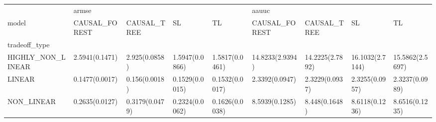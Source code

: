 \begin{tabular}{lllllllll}
\toprule
{} & \multicolumn{4}{l}{armse} & \multicolumn{4}{l}{aauuc} \\
model &   CAUSAL\_FOREST &     CAUSAL\_TREE &              SL &              TL &    CAUSAL\_FOREST &      CAUSAL\_TREE &               SL &               TL \\
tradeoff\_type     &                 &                 &                 &                 &                  &                  &                  &                  \\
\midrule
HIGHLY\_NON\_LINEAR &  2.5941(0.1471) &   2.925(0.0858) &  1.5947(0.0866) &  1.5817(0.0461) &  14.8233(2.9394) &  14.2225(2.7892) &  16.1032(2.7144) &  15.5862(2.5697) \\
LINEAR            &  0.1477(0.0017) &   0.156(0.0018) &  0.1529(0.0015) &  0.1532(0.0017) &   2.3392(0.0947) &   2.3229(0.0937) &   2.3255(0.0957) &   2.3237(0.0989) \\
NON\_LINEAR        &  0.2635(0.0127) &  0.3179(0.0479) &  0.2324(0.0062) &  0.1626(0.0038) &   8.5939(0.1285) &    8.448(0.1648) &   8.6118(0.1236) &   8.6516(0.1235) \\
\bottomrule
\end{tabular}
